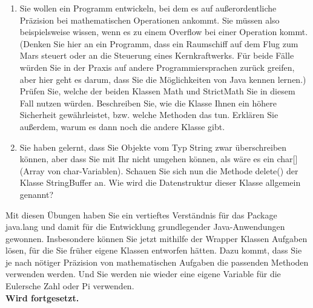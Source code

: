 \begin{enumerate}
	\item Sie wollen ein Programm entwickeln, bei dem es auf außerordentliche Präzision bei mathematischen Operationen ankommt. Sie müssen also beispielsweise wissen, wenn es zu einem Overflow bei einer Operation kommt. (Denken Sie hier an ein Programm, dass ein Raumschiff auf dem Flug zum Mars steuert oder an die Steuerung eines Kernkraftwerks. Für beide Fälle würden Sie in der Praxis auf andere Programmiersprachen zurück greifen, aber hier geht es darum, dass Sie die Möglichkeiten von Java kennen lernen.) Prüfen Sie, welche der beiden Klassen Math und StrictMath Sie in diesem Fall nutzen würden. Beschreiben Sie, wie die Klasse Ihnen ein höhere Sicherheit gewährleistet, bzw. welche Methoden das tun. Erklären Sie außerdem, warum es dann noch die andere Klasse gibt.
	
	\item Sie haben gelernt, dass Sie Objekte vom Typ String zwar überschreiben können, aber dass Sie mit Ihr nicht umgehen können, als wäre es ein char[] (Array von char-Variablen). Schauen Sie sich nun die Methode delete() der Klasse StringBuffer an. Wie wird die Datenstruktur dieser Klasse allgemein genannt?
	
\end{enumerate}

Mit diesen Übungen haben Sie ein vertieftes Verständnis für das Package java.lang und damit für die Entwicklung grundlegender Java-Anwendungen gewonnen. Insbesondere können Sie jetzt mithilfe der Wrapper Klassen Aufgaben lösen, für die Sie früher eigene Klassen entworfen hätten. Dazu kommt, dass Sie je nach nötiger Präzision von mathematischen Aufgaben die passenden Methoden verwenden werden. Und Sie werden nie wieder eine eigene Variable für die Eulersche Zahl oder Pi verwenden.\\

\textbf{Wird fortgesetzt.}